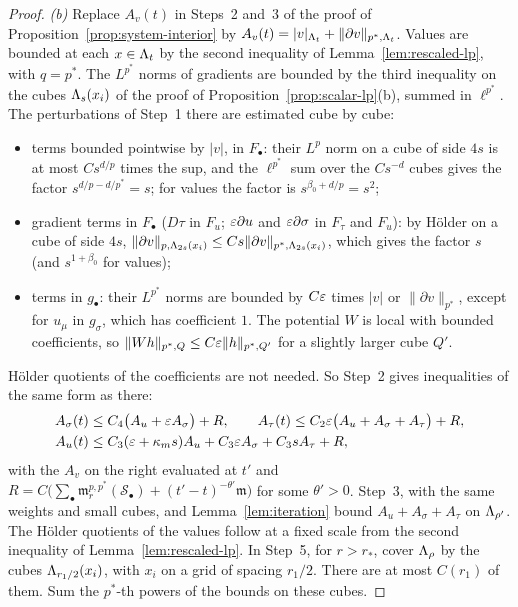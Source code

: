 \begin{proof}
\emph{(b)} Replace $A_v(t)$ in Steps~2 and~3 of the proof of Proposition~\ref{prop:system-interior} by $A_v(t)=|v|_{\Lambda_t}+\|\partial v\|_{p^*,\Lambda_t}$. Values are bounded at each $x\in\Lambda_t$ by the second inequality of Lemma~\ref{lem:rescaled-lp}, with $q=p^*$. The $L^{p^*}$ norms of gradients are bounded by the third inequality on the cubes $\Lambda_s(x_i)$ of the proof of Proposition~\ref{prop:scalar-lp}(b), summed in $\ell^{p^*}$. The perturbations of Step~1 there are estimated cube by cube:
\begin{itemize}
\item terms bounded pointwise by $|v|$, in $F_\bullet$: their $L^p$ norm on a cube of side $4s$ is at most $Cs^{d/p}$ times the sup, and the $\ell^{p^*}$ sum over the $Cs^{-d}$ cubes gives the factor $s^{d/p-d/p^*}=s$; for values the factor is $s^{\beta_0+d/p}=s^2$;
\item gradient terms in $F_\bullet$ ($D\tau$ in $F_u$; $\varepsilon\partial u$ and $\varepsilon\partial\sigma$ in $F_\tau$ and $F_u$): by H\"older on a cube of side $4s$, $\|\partial v\|_{p,\Lambda_{2s}(x_i)}\le Cs\|\partial v\|_{p^*,\Lambda_{2s}(x_i)}$, which gives the factor $s$ (and $s^{1+\beta_0}$ for values);
\item terms in $g_\bullet$: their $L^{p^*}$ norms are bounded by $C\varepsilon$ times $|v|$ or $\|\partial v\|_{p^*}$, except for $u_\mu$ in $g_\sigma$, which has coefficient $1$. The potential $W$ is local with bounded coefficients, so $\|W h\|_{p^*,Q}\le C\varepsilon\|h\|_{p^*,Q'}$ for a slightly larger cube $Q'$.
\end{itemize}
H\"older quotients of the coefficients are not needed. So Step~2 gives inequalities of the same form as there:
\[
\begin{aligned}
A_\sigma(t)&\le C_4\big(A_u+\varepsilon A_\sigma\big)+R,\qquad A_\tau(t)\le C_2\varepsilon\big(A_u+A_\sigma+A_\tau\big)+R,\\
A_u(t)&\le C_3(\varepsilon+\kappa_ms)A_u+C_3\varepsilon A_\sigma+C_3sA_\tau+R,
\end{aligned}
\]
with the $A_v$ on the right evaluated at $t'$ and $R=C\big(\sum_\bullet\mathfrak m^{p,p^*}_r(\mathcal S_\bullet)+(t'-t)^{-\theta'}\mathfrak m\big)$ for some $\theta'>0$. Step~3, with the same weights and small cubes, and Lemma~\ref{lem:iteration} bound $A_u+A_\sigma+A_\tau$ on $\Lambda_{\rho'}$. The H\"older quotients of the values follow at a fixed scale from the second inequality of Lemma~\ref{lem:rescaled-lp}. In Step~5, for $r>r_*$, cover $\Lambda_\rho$ by the cubes $\Lambda_{r_1/2}(x_i)$, with $x_i$ on a grid of spacing $r_1/2$. There are at most $C(r_1)$ of them. Sum the $p^*$-th powers of the bounds on these cubes.
\end{proof}

